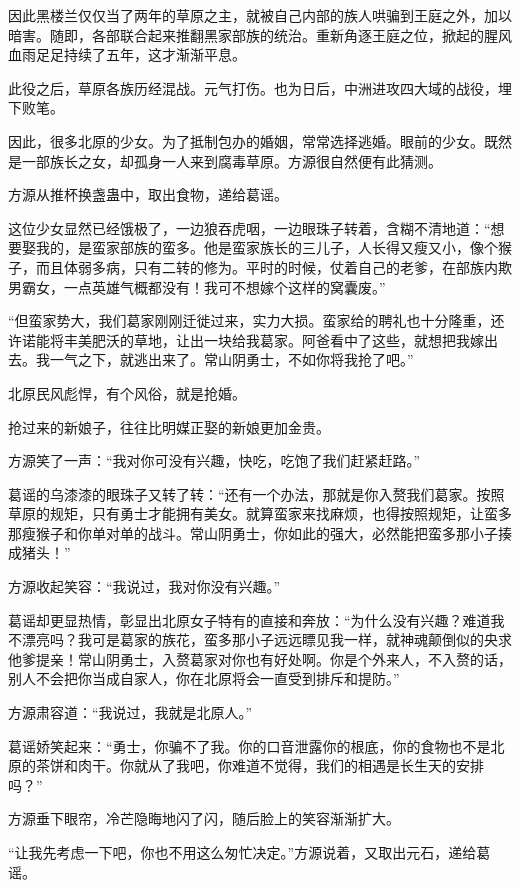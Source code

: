 \begin{this_body}
因此黑楼兰仅仅当了两年的草原之主，就被自己内部的族人哄骗到王庭之外，加以暗害。随即，各部联合起来推翻黑家部族的统治。重新角逐王庭之位，掀起的腥风血雨足足持续了五年，这才渐渐平息。

此役之后，草原各族历经混战。元气打伤。也为日后，中洲进攻四大域的战役，埋下败笔。

因此，很多北原的少女。为了抵制包办的婚姻，常常选择逃婚。眼前的少女。既然是一部族长之女，却孤身一人来到腐毒草原。方源很自然便有此猜测。

方源从推杯换盏蛊中，取出食物，递给葛谣。

这位少女显然已经饿极了，一边狼吞虎咽，一边眼珠子转着，含糊不清地道：“想要娶我的，是蛮家部族的蛮多。他是蛮家族长的三儿子，人长得又瘦又小，像个猴子，而且体弱多病，只有二转的修为。平时的时候，仗着自己的老爹，在部族内欺男霸女，一点英雄气概都没有！我可不想嫁个这样的窝囊废。”

“但蛮家势大，我们葛家刚刚迁徙过来，实力大损。蛮家给的聘礼也十分隆重，还许诺能将丰美肥沃的草地，让出一块给我葛家。阿爸看中了这些，就想把我嫁出去。我一气之下，就逃出来了。常山阴勇士，不如你将我抢了吧。”

北原民风彪悍，有个风俗，就是抢婚。

抢过来的新娘子，往往比明媒正娶的新娘更加金贵。

方源笑了一声：“我对你可没有兴趣，快吃，吃饱了我们赶紧赶路。”

葛谣的乌漆漆的眼珠子又转了转：“还有一个办法，那就是你入赘我们葛家。按照草原的规矩，只有勇士才能拥有美女。就算蛮家来找麻烦，也得按照规矩，让蛮多那瘦猴子和你单对单的战斗。常山阴勇士，你如此的强大，必然能把蛮多那小子揍成猪头！”

方源收起笑容：“我说过，我对你没有兴趣。”

葛谣却更显热情，彰显出北原女子特有的直接和奔放：“为什么没有兴趣？难道我不漂亮吗？我可是葛家的族花，蛮多那小子远远瞟见我一样，就神魂颠倒似的央求他爹提亲！常山阴勇士，入赘葛家对你也有好处啊。你是个外来人，不入赘的话，别人不会把你当成自家人，你在北原将会一直受到排斥和提防。”

方源肃容道：“我说过，我就是北原人。”

葛谣娇笑起来：“勇士，你骗不了我。你的口音泄露你的根底，你的食物也不是北原的茶饼和肉干。你就从了我吧，你难道不觉得，我们的相遇是长生天的安排吗？”

方源垂下眼帘，冷芒隐晦地闪了闪，随后脸上的笑容渐渐扩大。

“让我先考虑一下吧，你也不用这么匆忙决定。”方源说着，又取出元石，递给葛谣。


\end{this_body}
